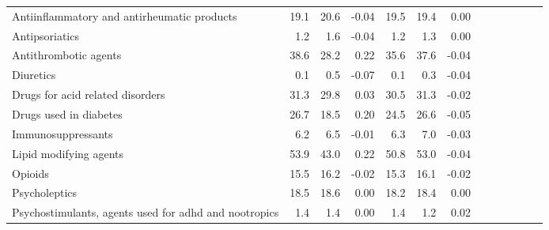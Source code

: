\documentclass[11pt,]{article}
\begin{document}
\begin{longtable}{lrrrrrrrrrrrr}
      Antiinflammatory and antirheumatic products & 19.1 & 20.6 & -0.04 & 19.5 & 19.4 &  0.00 \\ 
      Antipsoriatics &  1.2 &  1.6 & -0.04 &  1.2 &  1.3 &  0.00 \\ 
      Antithrombotic agents & 38.6 & 28.2 &  0.22 & 35.6 & 37.6 & -0.04 \\ 
      Diuretics &  0.1 &  0.5 & -0.07 &  0.1 &  0.3 & -0.04 \\ 
      Drugs for acid related disorders & 31.3 & 29.8 &  0.03 & 30.5 & 31.3 & -0.02 \\ 
      Drugs used in diabetes & 26.7 & 18.5 &  0.20 & 24.5 & 26.6 & -0.05 \\ 
      Immunosuppressants &  6.2 &  6.5 & -0.01 &  6.3 &  7.0 & -0.03 \\ 
      Lipid modifying agents & 53.9 & 43.0 &  0.22 & 50.8 & 53.0 & -0.04 \\ 
      Opioids & 15.5 & 16.2 & -0.02 & 15.3 & 16.1 & -0.02 \\ 
      Psycholeptics & 18.5 & 18.6 &  0.00 & 18.2 & 18.4 &  0.00 \\ 
      Psychostimulants, agents used for adhd and nootropics &  1.4 &  1.4 &  0.00 &  1.4 &  1.2 &  0.02 \\ 
   \bottomrule\end{longtable}
\clearpage
{}
\end{document}
